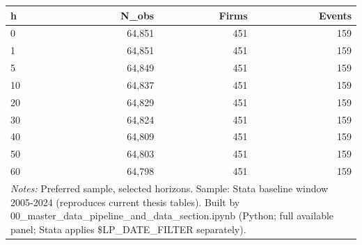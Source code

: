 \begin{tabular}{lrrr}
\toprule
h & N\_obs & Firms & Events \\
\midrule
0 & 64,851 & 451 & 159 \\
1 & 64,851 & 451 & 159 \\
5 & 64,849 & 451 & 159 \\
10 & 64,837 & 451 & 159 \\
20 & 64,829 & 451 & 159 \\
30 & 64,824 & 451 & 159 \\
40 & 64,809 & 451 & 159 \\
50 & 64,803 & 451 & 159 \\
60 & 64,798 & 451 & 159 \\
\bottomrule
\multicolumn{4}{p{0.95\linewidth}}{\footnotesize \textit{Notes:} Preferred sample, selected horizons. Sample: Stata baseline window 2005-2024 (reproduces current thesis tables). Built by 00\_master\_data\_pipeline\_and\_data\_section.ipynb (Python; full available panel; Stata applies \$LP\_DATE\_FILTER separately).} \\
\end{tabular}
